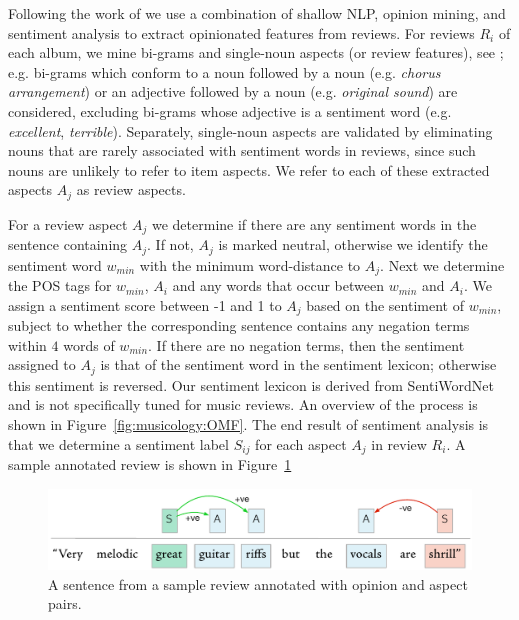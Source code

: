 Following the work of \cite{DongSOS13,DongOS14} we use a combination of shallow NLP, opinion mining, and sentiment analysis to extract opinionated features from reviews. For reviews $R_{i}$ of each album, we mine bi-grams and single-noun aspects (or review features), see \cite{Hu2004}; e.g. bi-grams which conform to a noun followed by a noun (e.g. \emph{chorus arrangement}) or an adjective followed by a noun (e.g. \emph{original sound}) are considered, excluding bi-grams whose adjective is a sentiment word (e.g. \emph{excellent}, \emph{terrible}). Separately, single-noun aspects are validated by eliminating nouns that are rarely associated with sentiment words in reviews, since such nouns are unlikely to refer to item aspects. We refer to each of these extracted aspects $A_{j}$ as review aspects.

For a review aspect $A_{j}$ we determine if there are any sentiment words in the sentence containing $A_{j}$. If not, $A_{j}$ is marked neutral, otherwise we identify the sentiment word $w_{min}$ with the minimum word-distance to $A_j$. Next we determine the POS tags for $w_{min}$, $A_i$ and any words that occur between $w_{min}$ and $A_i$. 
We assign a sentiment score between -1 and 1 to $A_j$ based on the sentiment of $w_{min}$, subject to whether the corresponding sentence contains any negation terms within $4$ words of $w_{min}$. If there are no negation terms, then the sentiment assigned to $A_j$ is that of the sentiment word in the sentiment lexicon; otherwise this sentiment is reversed. Our sentiment lexicon is derived from SentiWordNet \cite{esuli2006sentiwordnet} and is not specifically tuned for music reviews.
An overview of the process is shown in Figure~\ref{fig:musicology:OMF}. The end result of sentiment analysis is that we determine a sentiment label $S_{ij}$ for each aspect $A_j$ in review $R_i$. A sample annotated review is shown in Figure~\ref{fig:musicology:annotatedreview}

\begin{figure}[h]
\includegraphics[width=\columnwidth]{ch05_musicology_pics/annotation_sample2}
\caption{A sentence from a sample review annotated with opinion and aspect pairs.}
\label{fig:musicology:annotatedreview}
\end{figure}



